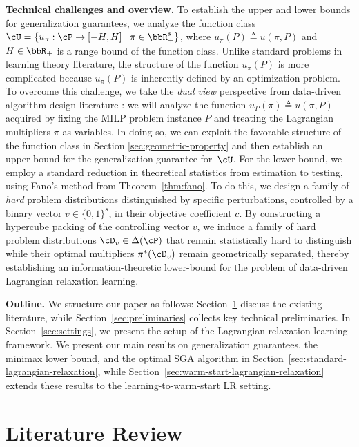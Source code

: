 \documentclass{article}
\theoremstyle{plain}
\theoremstyle{definition}
\theoremstyle{remark}
\begin{document}
\textbf{Technical challenges and overview.} To establish the upper and lower bounds for generalization guarantees, we analyze the function class $\cU = \{u_\pi: \cP \rightarrow [-H, H] \mid \pi \in \bbR^s_+\}$, where $u_\pi(P) \triangleq u(\pi, P)$ and $H \in \bbR_+$ is a range bound of the function class. Unlike standard problems in learning theory literature, the structure of the function $u_\pi(P)$ is more complicated because $u_{\pi}(P)$ is inherently defined by an optimization problem. To overcome this challenge, we take the \textit{dual view} perspective from data-driven algorithm design literature \citep{balcan2020data}: we will analyze the function $u_P(\pi) \triangleq u(\pi, P)$ acquired by fixing the MILP problem instance $P$ and treating the Lagrangian multipliers $\pi$ as variables. In doing so, we can exploit the favorable structure of the function class in Section \ref{sec:geometric-property} and then establish an upper-bound for the generalization guarantee for~$\cU$. For the lower bound, we employ a standard reduction in theoretical statistics from estimation to testing, using Fano's method from Theorem~\ref{thm:fano}. To do this, we design a family of \textit{hard} problem distributions distinguished by specific perturbations, controlled by a binary vector $v \in \{0, 1\}^s$, in their objective coefficient $c$. By constructing a hypercube packing of the controlling vector $v$, we induce a family of hard problem distributions $\cD_v \in \Delta(\cP)$ that remain statistically hard to distinguish while their optimal multipliers $\pi^*(\cD_v)$ remain geometrically separated, thereby establishing an information-theoretic lower-bound for the problem of data-driven Lagrangian relaxation learning.


\textbf{Outline.} We structure our paper as follows: Section~\ref{sec:review} discuss the existing literature, while Section~\ref{sec:preliminaries} collects key technical preliminaries. In Section~\ref{sec:settings}, we present the setup of the Lagrangian relaxation learning framework.   We present our main results on generalization guarantees, the minimax lower bound, and the optimal SGA algorithm in Section~\ref{sec:standard-lagrangian-relaxation}, while Section~\ref{sec:warm-start-lagrangian-relaxation} extends these results to the learning-to-warm-start LR setting. 


\section{Literature Review} \label{sec:review}
\end{document}
